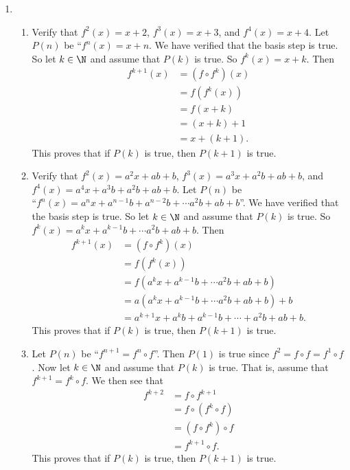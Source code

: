 \begin{enumerate}
\item \begin{enumerate}
\item Verify that $f^2(x) = x + 2$, $f^3(x) = x + 3$, and $f^4(x) = x + 4$.  Let $P(n)$ be 
``$f^n(x) = x + n$.  We have verified that the basis step is true.  So let $k \in \N$ and assume that $P(k)$ is true.  So $f^k(x) = x + k$.  Then
\begin{align*}
f^{k+1}(x) &= \left( f \circ f^k \right)(x) \\
           &= f \left( f^k(x) \right) \\
           &= f(x + k) \\
           &= (x + k) + 1 \\
           &= x + (k + 1).
\end{align*}
This proves that if $P(k)$ is true, then $P(k + 1)$ is true.

\item Verify that $f^2(x) = a^2x + ab + b$, $f^3(x) = a^3x + a^2b+ab+b$, and $f^4(x) = a^4x + a^3b + a^2b+ab+b$.  Let $P(n)$ be \\``$f^n(x) = a^nx + a^{n-1}b + a^{n-2}b + \cdots a^2b + ab + b$''.  We have verified that the basis step is true.  So let $k \in \N$ and assume that $P(k)$ is true.  So $f^k(x) = a^kx + a^{k-1}b + \cdots a^2b + ab + b$.  Then
\begin{align*}
f^{k+1}(x) &= \left( f \circ f^k \right)(x) \\
           &= f \left( f^k(x) \right) \\
           &= f\left(a^kx + a^{k-1}b + \cdots a^2b + ab + b \right) \\
           &= a\left(a^kx + a^{k-1}b + \cdots a^2b + ab + b \right) + b \\
           &= a^{k+1}x + a^kb + a^{k-1}b + \cdots + a^2b + ab + b.
\end{align*}
This proves that if $P(k)$ is true, then $P(k + 1)$ is true.

\item Let $P(n)$ be ``$f^{n+1} = f^n \circ f$''.  Then $P(1)$ is true since 
$f^2 = f \circ f = f^1 \circ f$.  Now let $k \in \N$ and assume that $P(k)$ is true.  That is, assume that $f^{k+1} = f^k \circ f$.  We then see that
\begin{align*}
f^{k+2} &= f \circ f^{k+1} \\
        &= f \circ \left( f^k \circ f \right) \\
        &= \left( f \circ f^k \right) \circ f \\
        &= f^{k+1} \circ f.
\end{align*}
This proves that if $P(k)$ is true, then $P(k + 1)$ is true.
\end{enumerate}
\end{enumerate}



